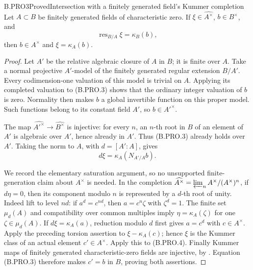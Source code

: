 \begin{claim}{B.PRO3}{Proved}{Intersection with a finitely generated field's Kummer completion}
Let \(A\subset B\) be finitely generated fields of characteristic
zero. If \(\xi\in\widehat{A^\times}\), \(b\in B^\times\), and
\[
                    \operatorname{res}_{B/A}\xi=\kappa_B(b),
                                                               \tag{B.PRO.3}
\]
then \(b\in A^\times\) and \(\xi=\kappa_A(b)\).
\end{claim}
\begin{proof}
Let \(A'\) be the relative algebraic closure of \(A\) in
\(B\); it is finite over \(A\). Take a normal projective
\(A'\)-model of the finitely generated regular extension
\(B/A'\). Every codimension-one valuation of this model is
trivial on \(A\). Applying its completed valuation to
(B.PRO.3) shows that the ordinary integer valuation of \(b\)
is zero. Normality then makes \(b\) a global invertible function
on this proper model. Such functions belong to its constant
field \(A'\), so \(b\in A'^\times\).

The map \(\widehat{A'^\times}\to\widehat{B^\times}\) is
injective: for every \(n\), an \(n\)-th root in \(B\) of an
element of \(A'\) is algebraic over \(A'\), hence already in
\(A'\). Thus (B.PRO.3) already holds over \(A'\). Taking the
norm to \(A\), with \(d=[A':A]\), gives
\[
                       d\xi=\kappa_A(N_{A'/A}b).          \tag{B.PRO.4}
\]

We record the elementary saturation argument, so no unsupported
finite-generation claim about \(A^\times\) is needed. In the
completion \(\widehat{A^\times}=\varprojlim_n
A^\times/(A^\times)^n\), if \(d\eta=0\), then its component
modulo \(n\) is represented by a \(d\)-th root of unity.
Indeed lift to level \(nd\): if \(a^d=c^{nd}\), then
\(a=c^n\zeta\) with \(\zeta^d=1\). The finite set
\(\mu_d(A)\) and compatibility over common multiples imply
\(\eta=\kappa_A(\zeta)\) for one \(\zeta\in\mu_d(A)\).
If \(d\xi=\kappa_A(a)\), reduction modulo \(d\) first gives
\(a=c^d\) with \(c\in A^\times\). Apply the preceding
torsion assertion to \(\xi-\kappa_A(c)\); hence \(\xi\)
is the Kummer class of an actual element \(c'\in A^\times\).
Apply this to (B.PRO.4). Finally Kummer maps of finitely generated
characteristic-zero fields are injective, by
\citep[Proposition~5.24 and Observation~6.9]{CarlsonHaineWolf2024}.
Equation (B.PRO.3) therefore makes \(c'=b\) in \(B\), proving
both assertions.
\end{proof}


